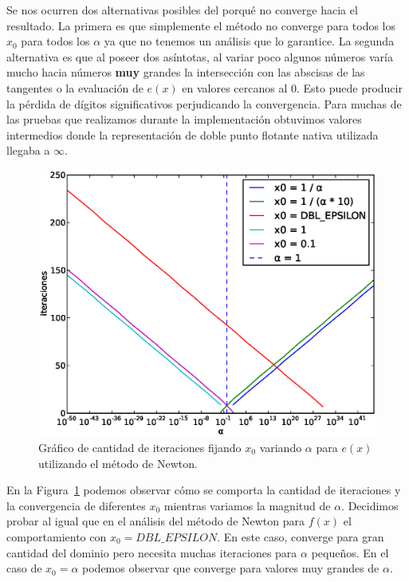 Se nos ocurren dos alternativas posibles del porqué no converge hacia el
resultado. La primera es que simplemente el método no converge para todos los
$x_0$ para todos los $\alpha$ ya que no tenemos un análisis que lo garantice.
La segunda alternativa es que al poseer dos asíntotas, al variar poco algunos
números varía mucho hacia números \textbf{muy} grandes la intersección con las
abscisas de las tangentes o la evaluación de $e(x)$ en valores cercanos al $0$.
Esto puede producir la pérdida de dígitos significativos perjudicando la
convergencia. Para muchas de las pruebas que realizamos durante la
implementación obtuvimos valores intermedios donde la representación de doble
punto flotante nativa utilizada llegaba a $\infty$.\\

\begin{figure}[!htbp]
  \begin{center}
    \includegraphics[scale=0.5]{graficos/new/e_newton_x0_fijo.eps}
    \caption{\label{fig:e_newton_x0_fijo} Gráfico de cantidad de iteraciones fijando $x_0$ variando $\alpha$ para $e(x)$ utilizando el método de Newton.}
  \end{center}
\end{figure}

En la Figura~\ref{fig:e_newton_x0_fijo} podemos observar cómo se comporta la
cantidad de iteraciones y la convergencia de diferentes $x_0$ mientras variamos
la magnitud de $\alpha$. Decidimos probar al igual que en el análisis del
método de Newton para $f(x)$ el comportamiento con $x_0 =
\textit{DBL\_EPSILON}$. En este caso, converge para gran cantidad del dominio
pero necesita muchas iteraciones para $\alpha$ pequeños. En el caso de $x_0 =
\alpha$ podemos observar que converge para valores muy grandes de $\alpha$.\\

